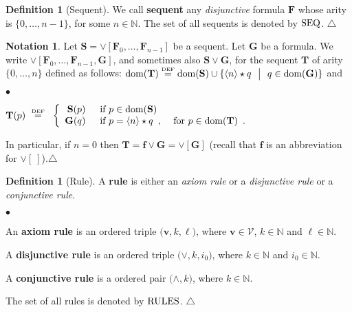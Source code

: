 \documentclass[copyright,creativecommons]{eptcs}
\newcommand{\vv}{\langle}
\newcommand{\ww}{\rangle}
\newcommand{\NN}{\mathbb{N}}
\newcommand{\eqdef}{\stackrel{\text{\tiny \textnormal{DEF}}}{=}}
\newcommand{\st}{ \ \ \big{|} \ \ }
\newcommand{\cV}{\mathcal{V}}
\newcommand{\Dis}[1]{\big( #1 \big)}
\newcommand{\FALSE}{\pmb{f}}
\newcommand{\bF}{\mathbf{F}}
\newcommand{\bG}{\mathbf{G}}
\newcommand{\bS}{\mathbf{S}}
\newcommand{\bT}{\mathbf{T}}
\newcommand{\bbv}{\mathbf{v}}
\newcommand{\dom}{\ensuremath{\textnormal{dom}}}
\newcommand{\seq}{\textnormal{SEQ}}
\newcommand{\rules}{\textnormal{RULES}}
\theoremstyle{definition}
\newtheorem{Definition}[theorem]{Definition}
\newtheorem{Notation}[theorem]{Notation}
\newcommand{\squishlist}{
 \begin{list}{$\bullet$}
  { \setlength{\itemsep}{0pt}
     \setlength{\parsep}{3pt}
     \setlength{\topsep}{3pt}
     \setlength{\partopsep}{0pt}
     \setlength{\leftmargin}{1em}
     \setlength{\labelwidth}{1.5em}
     \setlength{\labelsep}{0.5em} } }
\newcommand{\squishend}{
  \end{list}  }
\begin{document}
 \begin{Definition}[Sequent] \label{seq}
We call   \textbf{sequent}   any  \emph{disjunctive} formula $\bF$ whose arity is $\{0,\ldots,n-1\}$, for some $n \in \NN$.
The set of all sequents is denoted by $\seq$.
  \hfill $\triangle$
\end{Definition}


\begin{Notation} \label{not}
 Let $\bS = \vee[\bF_0,\ldots, \bF_{n-1}]$ be a sequent.  Let  $\bG$ be a formula. We write
$\vee[\bF_0,\ldots, \bF_{n-1}, \bG]$,  and sometimes also $\bS \vee \bG$,
 for the sequent $\bT$ of arity
$\{0,\ldots,n\}$  defined as follows: $\dom(\bT) \eqdef \dom(\bS)
\cup \{ \vv n \ww \star q \st q \in \dom(\bG) \}$ and
\squishlist
\item[] {\centering


${\bT}(p) \ \eqdef \ $ $\left\{
  \begin{array}{rl}
    \bS(p)\enspace &  \hbox{if $p \in \dom(\bS)$} \\
    \bG(q)\enspace &  \hbox{if $p = \vv n \ww \star q$\enspace , \quad for  $p  \in \dom(\bT)$\enspace.}   \end{array}
\right.$
 \par}
\squishend
 In particular, if $n= 0$  then  $\bT = \FALSE \vee \bG =  \vee[\bG]$ (recall that $\FALSE$ is an abbreviation for $\vee[\ ]$).\hfill $\triangle$
\end{Notation}



 \begin{Definition}[Rule]
 A \textbf{rule}  is either an \emph{axiom
 rule} or a \emph{disjunctive rule} or a \emph{conjunctive rule}.
 \squishlist
 \item An \textbf{axiom rule} is an ordered triple $\Dis{\bbv, k,\ell}$, where   $\bbv \in \cV$, $k \in \NN$ and $\ell \in \NN$.
 \item
A \textbf{disjunctive rule} is an ordered triple  $\Dis{\vee, k,i_0}$, where $k \in \NN$ and $i_0 \in \NN$.
 \item A \textbf{conjunctive rule} is a ordered pair  $\Dis{\wedge, k}$, where $k\in \NN$.
  \squishend
  The set of all rules is denoted by $\rules$.
    \hfill $\triangle$
 \end{Definition}
\end{document}
